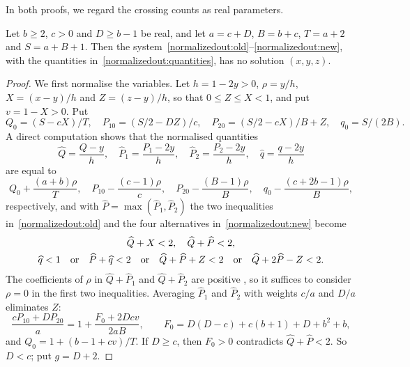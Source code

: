  In both proofs, we regard the crossing counts as real parameters.

\begin{lemma}
\label{normalizedout:scalar}
Let $b\ge2$, $c>0$ and $D\ge b-1$ be real, and let $a=c+D$, $B=b+c$, $T=a+2$ and $S=a+B+1$.
Then the system~\eqref{normalizedout:old}--\eqref{normalizedout:new},
with the quantities in~\eqref{normalizedout:quantities}, has no solution $(x,y,z)$.
\end{lemma}
\begin{proof}
We first normalise the variables. Let $h=1-2y>0$, $\rho=y/h$,
$X=(x-y)/h$ and $Z=(z-y)/h$, so that $0\le Z\le X<1$, and put $v=1-X>0$.
Put
\[
 Q_0=(S-cX)/T,\quad P_{10}=(S/2-DZ)/c,\quad
 P_{20}=(S/2-cX)/B+Z,\quad q_0=S/(2B).
\]
A direct computation shows that the normalised quantities
\[
 \widehat Q=\frac{Q-y}h,\quad \widehat P_1=\frac{P_1-2y}h,\quad \widehat P_2=\frac{P_2-2y}h,\quad \widehat q=\frac{q-2y}h
\]
are equal to
\[
 Q_0+\frac{(a+b)\rho}T,\quad P_{10}-\frac{(c-1)\rho}c,\quad P_{20}-\frac{(B-1)\rho}B,\quad q_0-\frac{(c+2b-1)\rho}B,
\]
respectively, and with $\widehat P=\max(\widehat P_1,\widehat P_2)$
the two inequalities in~\eqref{normalizedout:old} and the four alternatives in~\eqref{normalizedout:new} become
\[
\begin{gathered}
 \widehat Q+X<2,\quad\widehat Q+\widehat P<2,\\
 \widehat q<1\quad\hbox{or}\quad\widehat P+\widehat q<2
 \quad\hbox{or}\quad\widehat Q+\widehat P+Z<2
 \quad\hbox{or}\quad\widehat Q+2\widehat P-Z<2.
\end{gathered}
\]
The coefficients of $\rho$ in $\widehat Q+\widehat P_1$ and $\widehat Q+\widehat P_2$ are positive , so it suffices to consider $\rho=0$ in the first two inequalities.
Averaging $\widehat P_1$ and $\widehat P_2$ with weights $c/a$ and $D/a$ eliminates $Z$:
\[
 \frac{cP_{10}+DP_{20}}a=1+\frac{F_0+2Dcv}{2aB},\qquad
 F_0=D(D-c)+c(b+1)+D+b^2+b,
\]
and $Q_0=1+(b-1+cv)/T$. If $D\ge c$, then $F_0>0$ contradicts
$\widehat Q+\widehat P<2$. So $D<c$; put $g=D+2$.


\end{proof}

